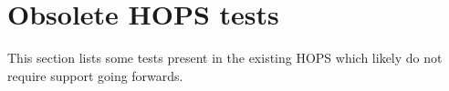 %
%
\section{Obsolete HOPS tests}
\label{sec:obsolete}

This section lists some tests present in the existing HOPS which likely
do not require support going forwards.

%
%
